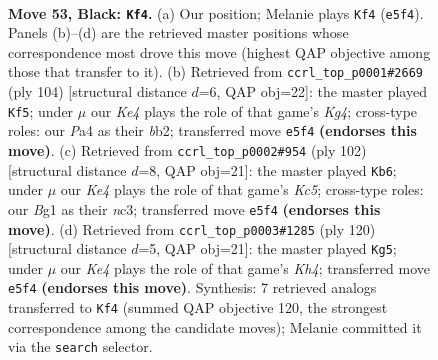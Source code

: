 \documentclass[11pt]{article}
\begin{document}
\clearpage

\begin{figure}[p]\centering
\begin{subfigure}{0.46\textwidth}\centering
\resizebox{\linewidth}{!}{%
\newchessgame
\chessboard[
  setfen={8/6K1/6p1/4k1P1/p7/3b4/8/6b1 b - - 13 53},
  showmover=false,
  pgfstyle=straightmove, color=movearrow, markmove={e5-f4}
]}
\caption{}
\end{subfigure}\hfill
\begin{subfigure}{0.46\textwidth}\centering
\resizebox{\linewidth}{!}{%
\newchessgame
\chessboard[
  setfen={8/8/3k4/3P4/p5K1/8/Bb6/8 w - - 1 53},
  showmover=false,
  pgfstyle=straightmove, color=movearrow, markmove={g4-f5}
]}
\caption{}
\end{subfigure}
\\[4pt]
\begin{subfigure}{0.46\textwidth}\centering
\resizebox{\linewidth}{!}{%
\newchessgame
\chessboard[
  setfen={8/8/p7/2K4p/7B/1Pn3P1/7k/8 w - - 2 52},
  showmover=false,
  pgfstyle=straightmove, color=movearrow, markmove={c5-b6}
]}
\caption{}
\end{subfigure}\hfill
\begin{subfigure}{0.46\textwidth}\centering
\resizebox{\linewidth}{!}{%
\newchessgame
\chessboard[
  setfen={8/8/k7/P4p2/2p4K/2B5/8/8 w - - 0 61},
  showmover=false,
  pgfstyle=straightmove, color=movearrow, markmove={h4-g5}
]}
\caption{}
\end{subfigure}
\caption{\textbf{Move 53, Black: \texttt{Kf4}.} (a) Our position; Melanie plays \texttt{Kf4} (\texttt{e5f4}). Panels (b)--(d) are the retrieved master positions whose correspondence most drove this move (highest QAP objective among those that transfer to it). (b) Retrieved from \texttt{ccrl\_top\_p0001\#2669} (ply 104) [structural distance $d$=6, QAP obj=22]: the master played \texttt{Kf5}; under $\mu$ our \emph{Ke4} plays the role of that game's \emph{Kg4}; cross-type roles: our \emph{P}a4 as their \emph{b}b2; transferred move \texttt{e5f4} \textbf{(endorses this move)}. (c) Retrieved from \texttt{ccrl\_top\_p0002\#954} (ply 102) [structural distance $d$=8, QAP obj=21]: the master played \texttt{Kb6}; under $\mu$ our \emph{Ke4} plays the role of that game's \emph{Kc5}; cross-type roles: our \emph{B}g1 as their \emph{n}c3; transferred move \texttt{e5f4} \textbf{(endorses this move)}. (d) Retrieved from \texttt{ccrl\_top\_p0003\#1285} (ply 120) [structural distance $d$=5, QAP obj=21]: the master played \texttt{Kg5}; under $\mu$ our \emph{Ke4} plays the role of that game's \emph{Kh4}; transferred move \texttt{e5f4} \textbf{(endorses this move)}. Synthesis: 7 retrieved analogs transferred to \texttt{Kf4} (summed QAP objective 120, the strongest correspondence among the candidate moves); Melanie committed it via the \texttt{search} selector.}
\label{fig:thought-m105}
\end{figure}
\end{document}
